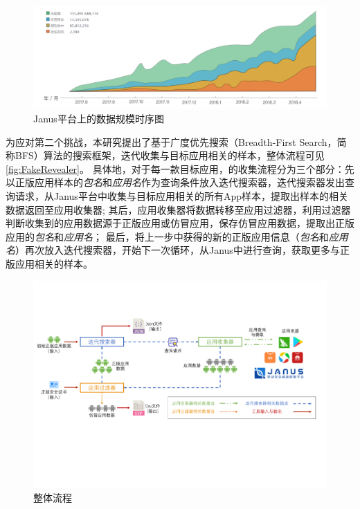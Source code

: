 \begin{figure}[htbp]
	\centering
	\includegraphics[width=\textwidth]{./Figures/edwin-Janus-data.png}
	\caption{Janus平台上的数据规模时序图}
	\label{fig:Janus-data}
	\vspace{-5mm}
\end{figure}


为应对第二个挑战，本研究提出了基于广度优先搜索（Breadth-First Search，简称BFS）算法的搜索框架\mytool，迭代收集与目标应用相关的样本，整体流程可见\autoref{fig:FakeRevealer}。
具体地，对于每一款目标应用，\mytool 的收集流程分为三个部分：先以正版应用样本的\emph{包名}和\emph{应用名}作为查询条件放入迭代搜索器，迭代搜索器发出查询请求，从Janus平台中收集与目标应用相关的所有App样本，提取出样本的相关数据返回至应用收集器;
其后，应用收集器将数据转移至应用过滤器，利用过滤器判断收集到的应用数据源于正版应用或仿冒应用，保存仿冒应用数据，提取出正版应用的\emph{包名}和\emph{应用名}；
最后，将上一步中获得的新的正版应用信息（\emph{包名}和\emph{应用名}）再次放入迭代搜索器，开始下一次循环，从Janus中进行查询，获取更多与正版应用相关的样本。

\begin{figure}[htbp]
	\centering
	\includegraphics[width=\textwidth]{./Figures/edwin-fakerevealer}
	\caption{\mytool 整体流程}
	\label{fig:FakeRevealer}
	\vspace{-3mm}
\end{figure}


